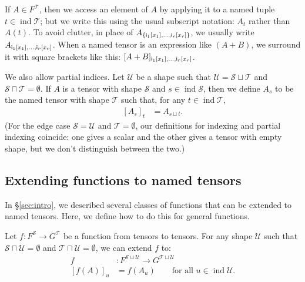 \documentclass{article}
\newcommand{\tuple}[1]{\{#1\}}
\DeclareMathOperator{\tupleshape}{ind}
\begin{document}
If $A \in F^{\mathcal{T}}$, then we access an element of $A$ by applying it to a named tuple $t \in \tupleshape\mathcal{T}$; but we write this using the usual subscript notation: $A_t$ rather than $A(t)$. To avoid clutter, in place of $A_{\tuple{\nidx{i\sub{1}}{x_1}, \ldots, \nidx{i\sub{r}}{x_r}}}$, we usually write $A_{\mathsf{i_\text{$1$}}[x_1], \ldots, \mathsf{i_\text{$r$}}[x_r]}$. When a named tensor is an expression like $(A+B)$, we surround it with square brackets like this: $[A+B]_{\mathsf{i_\text{$1$}}[x_1], \ldots, \mathsf{i_\text{$r$}}[x_r]}$.

We also allow partial indices. Let $\mathcal{U}$ be a shape such that $\mathcal{U} = \mathcal{S} \sqcup \mathcal{T}$ and $\mathcal{S} \sqcap \mathcal{T} = \emptyset$.
If $A$ is a tensor with shape $\mathcal{S}$ and $s \in \tupleshape \mathcal{S}$, then we define $A_s$ to be the named tensor with shape $\mathcal{T}$ such that, for any $t \in \tupleshape \mathcal{T}$,
\begin{align*}
\left[A_s\right]_t &= A_{s \sqcup t}.
\end{align*}
(For the edge case $\mathcal{S} = \mathcal{U}$ and $\mathcal{T} = \emptyset$, our definitions for indexing and partial indexing coincide: one gives a scalar and the other gives a tensor with empty shape, but we don't distinguish between the two.)

\subsection{Extending functions to named tensors}
\label{sec:tensorfunctions}

In \S\ref{sec:intro}, we described several classes of functions that can be extended to named tensors. Here, we define how to do this for general functions.

Let $f \colon F^{\mathcal{S}} \rightarrow G^{\mathcal{T}}$ be a function from tensors to tensors. For any shape $\mathcal{U}$ such that $\mathcal{S} \sqcap \mathcal{U} = \emptyset$ and $\mathcal{T} \sqcap \mathcal{U} = \emptyset$, we can extend $f$ to:
\begin{align*}
f &: F^{\mathcal{S} \sqcup \mathcal{U}} \rightarrow G^{\mathcal{T} \sqcup \mathcal{U}} \\
[f(A)]_u &= f(A_u) \qquad \text{for all $u \in \tupleshape\mathcal{U}$.}
\end{align*}
\end{document}
